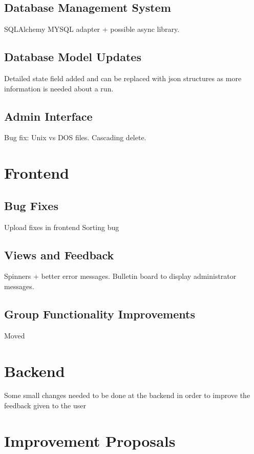 \subsection{Database Management System}
SQLAlchemy MYSQL adapter + possible async library.

\subsection{Database Model Updates}
Detailed state field added and can be replaced with json structures as more information is needed about a run.

\subsection{Admin Interface}

Bug fix: Unix vs DOS files.
Cascading delete.

\section{Frontend}
\subsection{Bug Fixes}
Upload fixes in frontend
Sorting bug

\subsection{Views and Feedback}
Spinners + better error messages. Bulletin board to display administrator messages.

\subsection{Group Functionality Improvements}
Moved

\section{Backend}
Some small changes needed to be done at the backend in order to improve the feedback given to the user


\section{Improvement Proposals}
